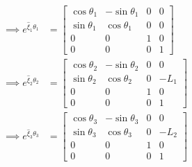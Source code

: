 \begin{align*}
    \implies
    e^{\widehat{\xi}_{1} \theta_{1}}
     & =
    \begin{bmatrix}
        \cos \theta_{1} & -\sin \theta_{1} & 0 & 0 \\
        \sin \theta_{1} & \cos \theta_{1}  & 0 & 0 \\
        0               & 0                & 1 & 0 \\
        0               & 0                & 0 & 1
    \end{bmatrix}
    \\
    \implies
    e^{\widehat{\xi}_{2} \theta_{2}}
     & =
    \begin{bmatrix}
        \cos \theta_{2} & -\sin \theta_{2} & 0 & 0    \\
        \sin \theta_{2} & \cos \theta_{2}  & 0 & -L_1 \\
        0               & 0                & 1 & 0    \\
        0               & 0                & 0 & 1
    \end{bmatrix}
    \\
    \implies
    e^{\widehat{\xi}_{3} \theta_{3}}
     & =
    \begin{bmatrix}
        \cos \theta_{3} & -\sin \theta_{3} & 0 & 0    \\
        \sin \theta_{3} & \cos \theta_{3}  & 0 & -L_2 \\
        0               & 0                & 1 & 0    \\
        0               & 0                & 0 & 1
    \end{bmatrix}
\end{align*}

